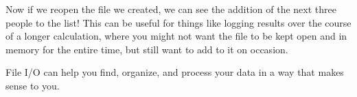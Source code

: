     Now if we reopen the file we created, we can see the addition of the
next three people to the list! This can be useful for things like
logging results over the course of a longer calculation, where you might
not want the file to be kept open and in memory for the entire time, but
still want to add to it on occasion.

File I/O can help you find, organize, and process your data in a way
that makes sense to you.
